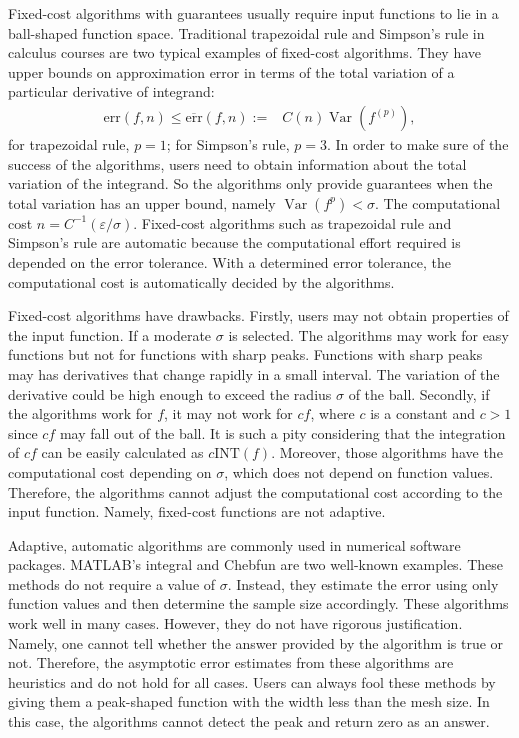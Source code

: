 \documentclass{iitthesis}
\DeclareMathOperator{\Var}{Var}
\theoremstyle{definition}
\theoremstyle{remark}
\begin{document}
\label{secgua}

Fixed-cost algorithms with guarantees usually require input functions to lie in a ball-shaped function space. Traditional trapezoidal rule and Simpson's rule in calculus courses are two typical examples of fixed-cost algorithms. They have upper bounds on approximation error in terms of the total variation of a particular derivative of integrand:
\begin{align}\label{errorsimple}
    \text{err}(f,n)\le\overline{\text{err}}(f,n):=&C(n)\Var(f^{(p)}),
\end{align}
for trapezoidal rule, $p=1$; for Simpson's rule, $p=3$. In order to make sure of the success of the algorithms, users need to obtain information about the total variation of the integrand. So the algorithms only provide guarantees when the total variation has an upper bound, namely $\Var(f^{p})<\sigma$. The computational cost $n=C^{-1}(\varepsilon/\sigma)$. Fixed-cost algorithms such as trapezoidal rule and Simpson's rule are automatic because the computational effort required is depended on the error tolerance. With a determined error tolerance, the computational cost is automatically decided by the algorithms.

Fixed-cost algorithms have drawbacks. Firstly, users may not obtain properties of the input function. If a moderate $\sigma$ is selected. The algorithms may work for easy functions but not for functions with sharp peaks. Functions with sharp peaks may has derivatives that change rapidly in a small interval. The variation of the derivative could be high enough to exceed the radius $\sigma$ of the ball. Secondly, if the algorithms work for $f$, it may not work for $cf$, where $c$ is a constant and $c>1$ since $cf$ may fall out of the ball. It is such a pity considering that the integration of $cf$ can be easily calculated as $c\text{INT}(f)$. Moreover, those algorithms have the computational cost depending on $\sigma$, which does not depend on function values. Therefore, the algorithms cannot adjust the computational cost according to the input function. Namely, fixed-cost functions are not adaptive.

\label{secada}

Adaptive, automatic algorithms are commonly used in numerical software packages. MATLAB's integral and Chebfun are two well-known examples. These methods do not require a value of $\sigma$. Instead, they estimate the error using only function values and then determine the sample size accordingly. These algorithms work well in many cases. However, they do not have rigorous justification. Namely, one cannot tell whether the answer provided by the algorithm is true or not. Therefore, the asymptotic error estimates from these algorithms are heuristics and do not hold for all cases. Users can always fool these methods by giving them a peak-shaped function with the width less than the mesh size. In this case, the algorithms cannot detect the peak and return zero as an answer.
\end{document}
